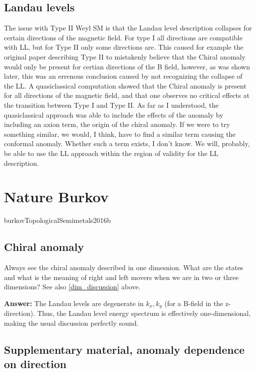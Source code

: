 \documentclass[11pt]{article}
\begin{document}
\subsection{Landau levels}
\label{sec:org978a228}
The issue with Type II Weyl SM is that the Landau level description collapses for certain directions of the magnetic field.
For type I all directions are compatible with LL, but for Type II only some directions are.
This caused for example the original paper describing Type II to mistakenly believe that the Chiral anomaly would only be present for certian directions of the B field, however, as was shown later, this was an errenous conclusion caused by not recognizing the collapse of the LL.
A quasiclassical computation showed that the Chiral anomaly is present for all directions of the magnetic field, and that one observes no critical effects at the transition between Type I and Type II.
As far as I understood, the quasiclassical approach was able to include the effects of the anomaly by including an axion term, the origin of the chiral anomaly.
If we were to try something similar, we would, I think, have to find a similar term causing the conformal anomaly.
Whether such a term exists, I don't know.
We will, probably, be able to use the LL approach within the region of validity for the LL description.

\section{Nature Burkov}
\label{sec:org8028f8b}
burkovTopologicalSemimetals2016b
\subsection{Chiral anomaly}
\label{sec:orgcceb123}
Always see the chiral anomaly described in one dimesnion.
What are the states and what is the meaning of right and left movers when we are in two or three dimensions?
See also \ref{dim_discussion} above.

\textbf{Answer:}
The Landau levels are degenerate in \(k_x, k_y\) (for a B-field in the z-direction).
Thus, the Landau level energy spectrum is effectively one-dimensional, making the usual discussion perfectly sound.
\subsection{Supplementary material, anomaly dependence on direction}
\label{sec:orgf6ae5dd}
\end{document}
